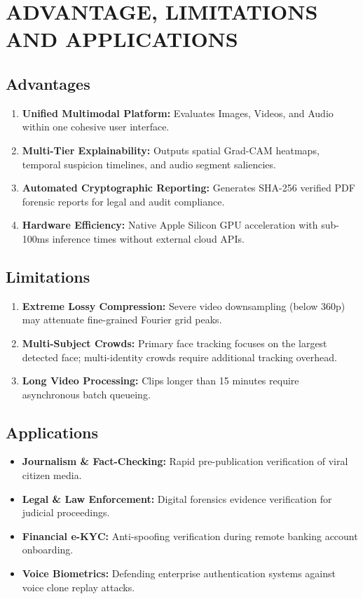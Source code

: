 \documentclass[12pt,a4paper]{report}
\begin{document}
\chapter{ADVANTAGE, LIMITATIONS AND APPLICATIONS}

\section{Advantages}
\begin{enumerate}[label=\arabic*.,leftmargin=*]
    \item \textbf{Unified Multimodal Platform:} Evaluates Images, Videos, and Audio within one cohesive user interface.
    \item \textbf{Multi-Tier Explainability:} Outputs spatial Grad-CAM heatmaps, temporal suspicion timelines, and audio segment saliencies.
    \item \textbf{Automated Cryptographic Reporting:} Generates SHA-256 verified PDF forensic reports for legal and audit compliance.
    \item \textbf{Hardware Efficiency:} Native Apple Silicon GPU acceleration with sub-100ms inference times without external cloud APIs.
\end{enumerate}

\section{Limitations}
\begin{enumerate}[label=\arabic*.,leftmargin=*]
    \item \textbf{Extreme Lossy Compression:} Severe video downsampling (below 360p) may attenuate fine-grained Fourier grid peaks.
    \item \textbf{Multi-Subject Crowds:} Primary face tracking focuses on the largest detected face; multi-identity crowds require additional tracking overhead.
    \item \textbf{Long Video Processing:} Clips longer than 15 minutes require asynchronous batch queueing.
\end{enumerate}

\section{Applications}
\begin{itemize}[leftmargin=*]
    \item \textbf{Journalism \& Fact-Checking:} Rapid pre-publication verification of viral citizen media.
    \item \textbf{Legal \& Law Enforcement:} Digital forensics evidence verification for judicial proceedings.
    \item \textbf{Financial e-KYC:} Anti-spoofing verification during remote banking account onboarding.
    \item \textbf{Voice Biometrics:} Defending enterprise authentication systems against voice clone replay attacks.
\end{itemize}
\end{document}
